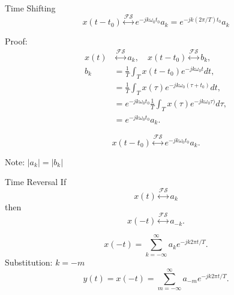 \begin{frame}[plain]{Time Shifting}
    \begin{equation}
        x(t-t_0) \overset{\mathcal{FS}}{\longleftrightarrow} e^{-jk\omega_0 t_0}a_k = e^{-jk(2\pi/T) t_0}a_k
    \end{equation}
    {
        \noindent Proof:\\%
        \pause
        \begin{equation*}
            \begin{aligned}
          x(t) &\overset{\mathcal{FS}}{\longleftrightarrow} a_k, \quad x(t-t_0) \overset{\mathcal{FS}}{\longleftrightarrow} b_k,\\
                b_k &=  \frac{1}{T}\int_{T}x(t-t_0)e^{-jk\omega_0 t}dt,\\
                &= \frac{1}{T}\int_{T}x(\tau)e^{-jk\omega_0(\tau + t_0)}dt,\\
                &= e^{-jk\omega_0  t_0}\frac{1}{T}\int_{T}x(\tau)e^{-jk\omega_0\tau)}d\tau,\\
                &= e^{-jk\omega_0  t_0}a_k.
            \end{aligned}
        \end{equation*}

        \begin{equation*}
             x(t-t_0) \overset{\mathcal{FS}}{\longleftrightarrow} e^{-jk\omega_0  t_0}a_k.
        \end{equation*}

        Note: $|a_k| = |b_k|$
    }
\end{frame}


\begin{frame}[plain]{Time Reversal}
    If
    \begin{equation}
        x(t) \overset{\mathcal{FS}}{\longleftrightarrow} a_k
    \end{equation}
    then
    \begin{equation}
        x(-t) \overset{\mathcal{FS}}{\longleftrightarrow} a_{-k}.
    \end{equation}
    {
        \begin{equation}
            x(-t) =  \sum_{k=-\infty}^{\infty}a_ke^{-jk2\pi t/T}.
        \end{equation}
        Substitution: $k=-m$
        \begin{equation*}
            y(t) = x(-t) = \sum_{m=-\infty}^{\infty}a_{-m}e^{-jk2\pi t/T}.
        \end{equation*}

    }
\end{frame}

